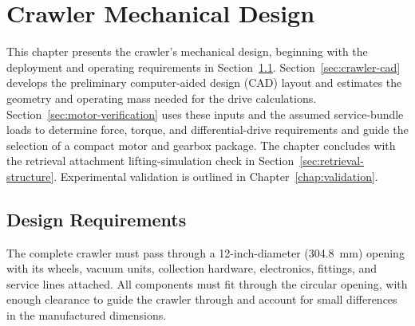 \chapter{Crawler Mechanical Design}
\label{chap:crawler}
\begingroup
\setlength{\emergencystretch}{3em}
\newcommand{\mechanicalplaceholder}[3]{%
\begin{figure}[htbp]
\centering
\fbox{\begin{minipage}[c][32mm][c]{0.88\textwidth}
\centering\small\singlespacing\textbf{IMAGE PLACEHOLDER}\par\medskip #1
\end{minipage}}
\caption{#2}\label{#3}
\end{figure}}

This chapter presents the crawler's mechanical design, beginning with the deployment and operating requirements in Section~\ref{sec:mechanical-requirements}. Section~\ref{sec:crawler-cad} develops the preliminary computer-aided design (CAD) layout and estimates the geometry and operating mass needed for the drive calculations. Section~\ref{sec:motor-verification} uses these inputs and the assumed service-bundle loads to determine force, torque, and differential-drive requirements and guide the selection of a compact motor and gearbox package. The chapter concludes with the retrieval attachment lifting-simulation check in Section~\ref{sec:retrieval-structure}. Experimental validation is outlined in Chapter~\ref{chap:validation}.


\section{Design Requirements}
\label{sec:mechanical-requirements}
The complete crawler must pass through a 12-inch-diameter (304.8~mm) opening with its wheels, vacuum units, collection hardware, electronics, fittings, and service lines attached. All components must fit through the circular opening, with enough clearance to guide the crawler through and account for small differences in the manufactured dimensions.

